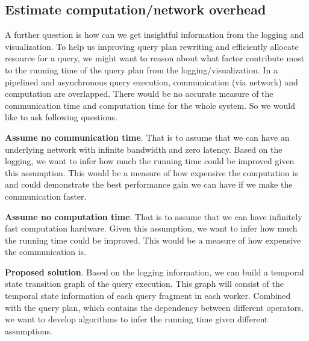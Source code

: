 \documentclass[11pt]{scrartcl}
\begin{document}


\subsection{Estimate computation/network overhead}
\label{sec:overhead}

A further question is  how can we get insightful information from the logging and visualization. To help us improving query plan rewriting and efficiently allocate resource for a query, we might want to reason about what factor contribute most to the running time of the query plan from the logging/visualization. In a pipelined and asynchronous query execution, communication (via network) and computation are overlapped. There would be no accurate measure of the communication time and computation time for the whole system.  So we would like to ask following questions.

\noindent\textbf{Assume no communication time}.  That is to assume that we can have an underlying network with infinite bandwidth and zero latency. Based on the logging, we want to infer how much the running time could be improved given this assumption. This would be a measure of how expensive the computation is and could demonstrate the best performance gain we can have if we make the communication faster.

\noindent\textbf{Assume no computation time}.  That is to assume that we can have infinitely fast computation hardware. Given this assumption, we want to infer how much the running time could be improved. This would be a measure of how expensive the communication is.

\noindent\textbf{Proposed solution}.  Based on the logging information, we can build a temporal state transition graph of the query execution. This graph will consist of the temporal state information of each query fragment in each worker. Combined with the query plan, which contains the dependency between different operators, we want to develop algorithms to infer the running time given different assumptions.



\end{document}
